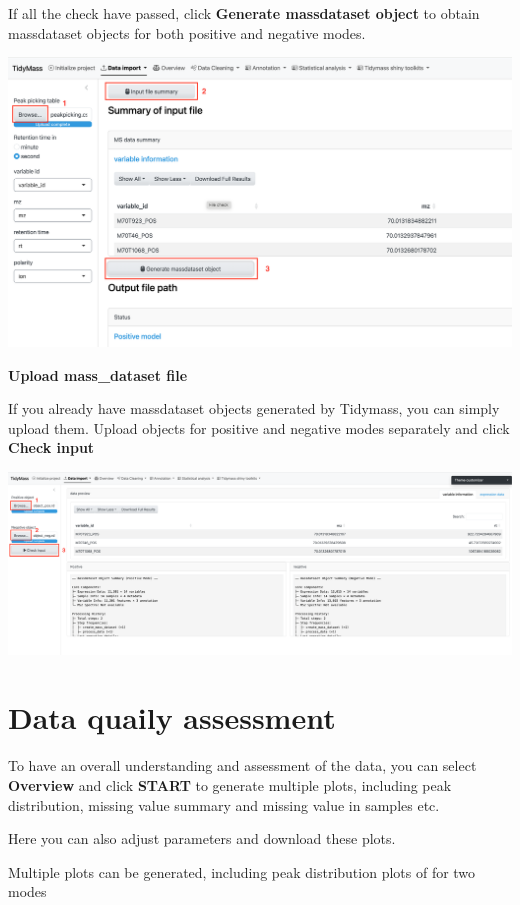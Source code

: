 \documentclass[
]{book}
\begin{document}
If all the check have passed, click \textbf{Generate massdataset object} to obtain massdataset objects for both positive and negative modes.

\includegraphics{figures/select_table.png}

\textbf{Upload mass\_dataset file}

If you already have massdataset objects generated by Tidymass, you can simply upload them. Upload objects for positive and negative modes separately and click \textbf{Check input}

\includegraphics{figures/object_page.png}

\section{Data quaily assessment}\label{data-quaily-assessment}

To have an overall understanding and assessment of the data, you can select \textbf{Overview} and click \textbf{START} to generate multiple plots, including peak distribution, missing value summary and missing value in samples etc.

Here you can also adjust parameters and download these plots.

Multiple plots can be generated, including peak distribution plots of for two modes
\end{document}
